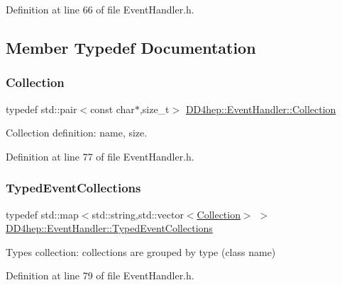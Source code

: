 Definition at line 66 of file Event\+Handler.\+h.



\subsection{Member Typedef Documentation}
\hypertarget{class_d_d4hep_1_1_event_handler_abc271087910b2013962fa4a83d4f349e}{}\label{class_d_d4hep_1_1_event_handler_abc271087910b2013962fa4a83d4f349e} 
\subsubsection{\texorpdfstring{Collection}{Collection}}
{\footnotesize\ttfamily typedef std\+::pair$<$const char$\ast$,size\+\_\+t$>$ \hyperlink{class_d_d4hep_1_1_event_handler_abc271087910b2013962fa4a83d4f349e}{D\+D4hep\+::\+Event\+Handler\+::\+Collection}}



Collection definition\+: name, size. 



Definition at line 77 of file Event\+Handler.\+h.

\hypertarget{class_d_d4hep_1_1_event_handler_a4d441ff8a824b1e2f278e8b7a6391af3}{}\label{class_d_d4hep_1_1_event_handler_a4d441ff8a824b1e2f278e8b7a6391af3} 
\subsubsection{\texorpdfstring{Typed\+Event\+Collections}{TypedEventCollections}}
{\footnotesize\ttfamily typedef std\+::map$<$std\+::string,std\+::vector$<$\hyperlink{class_d_d4hep_1_1_event_handler_abc271087910b2013962fa4a83d4f349e}{Collection}$>$ $>$ \hyperlink{class_d_d4hep_1_1_event_handler_a4d441ff8a824b1e2f278e8b7a6391af3}{D\+D4hep\+::\+Event\+Handler\+::\+Typed\+Event\+Collections}}



Types collection\+: collections are grouped by type (class name) 



Definition at line 79 of file Event\+Handler.\+h.



